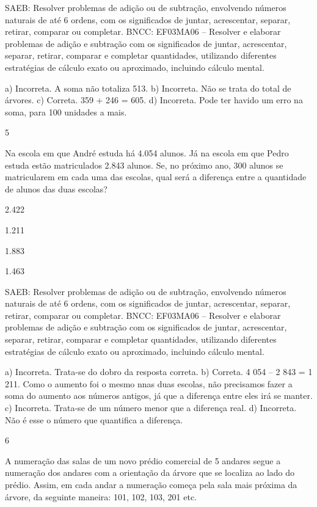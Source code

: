 \begin{multicols}{2}
{\begin{escolha}
{SAEB: Resolver problemas de adição ou de subtração,
envolvendo números naturais de até 6 ordens, com os significados de
juntar, acrescentar, separar, retirar, comparar ou completar.
BNCC: EF03MA06 – Resolver e elaborar problemas de adição e subtração com os significados de
juntar, acrescentar, separar, retirar, comparar e completar quantidades, utilizando diferentes
estratégias de cálculo exato ou aproximado, incluindo cálculo mental.

a) Incorreta. A soma não totaliza 513.
b) Incorreta. Não se trata do total de árvores.
c) Correta. 359 + 246 = 605.
d) Incorreta. Pode ter havido um erro na soma, para 100 unidades a mais.

\num{5}

Na escola em que André estuda há 4.054 alunos. Já na escola em que
Pedro estuda estão matriculados 2.843 alunos. Se, no próximo ano, 300
alunos se matricularem em cada uma das escolas, qual será a diferença
entre a quantidade de alunos das duas escolas?

\begin{escolha}
\item
  2.422
\item
  1.211
\item
  1.883
\item
  1.463
\end{escolha}


SAEB: Resolver problemas de adição ou de subtração,
envolvendo números naturais de até 6 ordens, com os significados de
juntar, acrescentar, separar, retirar, comparar ou completar.
BNCC: EF03MA06 – Resolver e elaborar problemas de adição e subtração com os significados de
juntar, acrescentar, separar, retirar, comparar e completar quantidades, utilizando diferentes
estratégias de cálculo exato ou aproximado, incluindo cálculo mental.

a) Incorreta. Trata-se do dobro da resposta correta.
b) Correta. 4 054 -- 2 843 = 1 211. Como o aumento foi o mesmo nnas duas escolas, não
precisamos fazer a soma do aumento aos números antigos, já que a diferença entre eles irá se manter.
c) Incorreta. Trata-se de um número menor que a diferença real.
d) Incorreta. Não é esse o número que quantifica a diferença.

\num{6}

A numeração das salas de um novo prédio comercial de 5 andares segue a
numeração dos andares com a orientação da árvore que se localiza ao
lado do prédio. Assim, em cada andar a numeração começa pela sala mais
próxima da árvore, da seguinte maneira: 101, 102, 103, 201 etc.

}
\end{escolha}}
\end{multicols}

